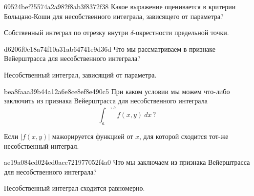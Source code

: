 \begin{note}{69524bef25574a2a982f8ab3f8372f38}
    Какое выражение оценивается в критерии Больцано-Коши для несобственного интеграла, зависящего от параметра?

    \begin{cloze}{1}
        Собственный интеграл по отрезку внутри \({ \delta }\)-окрестности предельной точки.
    \end{cloze}
\end{note}

\begin{note}{d6206f0e18a74f10a31ab64741e9d36d}
    Что мы рассматриваем в признаке Вейерштрасса для несобственного интеграла?

    \begin{cloze}{1}
        Несобственный интеграл, зависящий от параметра.
    \end{cloze}
\end{note}

\begin{note}{bea8faaa39b44a12a6e8ce8ef8e490c5}
    При каком условии мы можем что-либо заключить из признака Вейерштрасса для несобственного интеграла
    \[
        \int_{a}^{\to b} f(x, y)\: dx\,?
    \]

    \begin{cloze}{1}
        Если \({ \left\lvert f(x, y) \right\rvert }\) мажорируется функцией от \({ x }\), для которой сходится тот-же несобственный интеграл.
    \end{cloze}
\end{note}

\begin{note}{ae19a084cd024ed0acc721977052f4a0}
    Что мы заключаем из признака Вейерштрасса для несобственного интеграла?

    \begin{cloze}{1}
        Несобственный интеграл сходится равномерно.
    \end{cloze}
\end{note}


